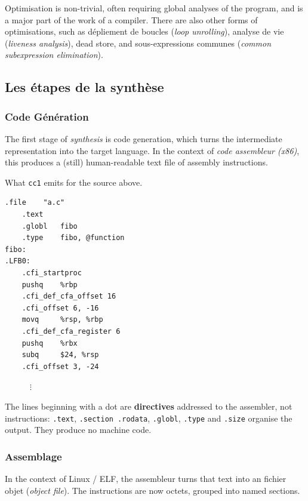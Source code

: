 Optimisation is non-trivial, often requiring global analyses of the program,
and is a major part of the work of a compiler. There are also other forms of
optimisations, such as dépliement de boucles (\textit{loop unrolling}), analyse
de vie (\textit{liveness analysis}), dead store, and sous-expressions communes
(\textit{common subexpression elimination}).

\subsection{Les étapes de la synthèse}
\subsubsection{Code Génération}
The first stage of \textit{synthesis} is code generation, which turns the intermediate
representation into the target language. In the context of \textit{code assembleur (x86)},
this produces a (still) human-readable text file of assembly instructions.

\begin{example}
  What \texttt{cc1} emits for the source above.
\begin{lstlisting}[language=gas]
    .file    "a.c"
    .text
    .globl   fibo
    .type    fibo, @function
fibo:
.LFB0:
    .cfi_startproc
    pushq    %rbp
    .cfi_def_cfa_offset 16
    .cfi_offset 6, -16
    movq     %rsp, %rbp
    .cfi_def_cfa_register 6
    pushq    %rbx
    subq     $24, %rsp
    .cfi_offset 3, -24
\end{lstlisting}
$\qquad\quad\vdots$
\end{example}

\begin{remark}
  The lines beginning with a dot are \textbf{directives} addressed to the
  assembler, not instructions: \texttt{.text}, \texttt{.section .rodata},
  \texttt{.globl}, \texttt{.type} and \texttt{.size} organise the output. They
  produce no machine code.
\end{remark}

\subsubsection{Assemblage}
\begin{definition}[Assemblage]
  In the context of Linux / ELF, the assembleur turns that text into an fichier
  objet (\textit{object file}). The instructions are now octets, grouped into
  named sections.
\end{definition}


